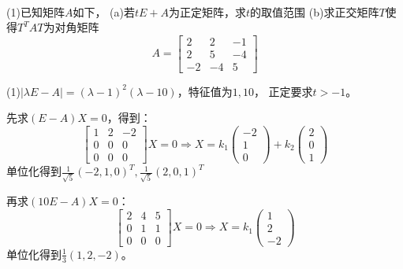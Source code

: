 ~

\begin{exercise}[正交变换法]
  (1)已知矩阵$A$如下，
  (a)若$tE + A$为正定矩阵，求$t$的取值范围
  (b)求正交矩阵$T$使得$T^TAT$为对角矩阵
  \begin{equation*}
    A = \left[
      \begin{array}{ccc}
        2&2&-1 \\
         2&5&-4 \\
         -2&-4&5
      \end{array}
    \right]
  \end{equation*}
\end{exercise}

\begin{solution}
  (1)$|\lambda E - A| = (\lambda - 1)^2 (\lambda - 10)$，特征值为$1, 10$，
  正定要求$t > -1$。

  先求$(E - A)X = 0$，得到：
  \begin{equation*}
    \left[
      \begin{array}{ccc}
        1&2&-2 \\
         0&0&0 \\
         0&0&0
      \end{array}
    \right]X = 0 \Rightarrow X = k_1 \left(
      \begin{array}{c}
        -2\\
        1\\
        0
      \end{array}
    \right) + k_2 \left(
      \begin{array}{c}
        2\\
        0\\
        1
      \end{array}
    \right)
  \end{equation*}
  单位化得到$\frac{1}{\sqrt{5}}(-2,1,0)^T, \frac{1}{\sqrt{5}}(2,0,1)^T$

  再求$(10E - A)X = 0$：
  \begin{equation*}
    \left[
      \begin{array}{ccc}
        2&4&5 \\
         0&1&1 \\
         0&0&0
      \end{array}
    \right]X = 0 \Rightarrow X = k_1 \left(
      \begin{array}{c}
        1 \\
        2\\
        -2
      \end{array}
    \right)
  \end{equation*}
  单位化得到$\frac{1}{3}(1,2,-2)$。


\end{solution}
